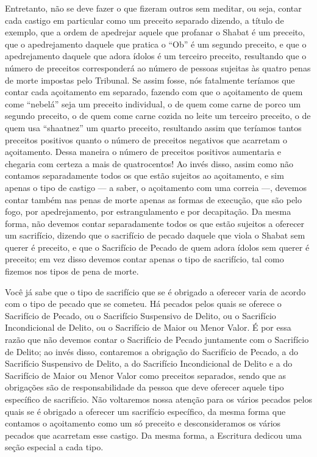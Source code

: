 Entretanto, não se deve fazer o que fizeram outros sem meditar, ou seja,
contar cada castigo em particular como um preceito separado dizendo, a
título de exemplo, que a ordem de apedrejar aquele que profanar o Shabat
é um preceito, que o apedrejamento daquele que pratica o ``Ob'' é um
segundo preceito, e que o apedrejamento daquele que adora ídolos é um
terceiro preceito, resultando que o número de preceitos corresponderá ao
número de pessoas sujeitas às quatro penas de morte impostas pelo
Tribunal. Se assim fosse, nós fatalmente teríamos que contar cada
açoitamento em separado, fazendo com que o açoitamento de quem come
``nebelá'' seja um preceito individual, o de quem come carne de porco um
segundo preceito, o de quem come carne cozida no leite um terceiro
preceito, o de quem usa ``shaatnez'' um quarto preceito, resultando
assim que teríamos tantos preceitos positivos quanto o número de
preceitos negativos que acarretam o açoitamento. Dessa maneira o número
de preceitos positivos aumentaria e chegaria com certeza a mais de
quatrocentos! Ao invés disso, assim como não contamos separadamente
todos os que estão sujeitos ao açoitamento, e sim apenas o tipo de
castigo --- a saber, o açoitamento com uma correia ---, devemos contar
também nas penas de morte apenas as formas de execução, que são pelo
fogo, por apedrejamento, por estrangulamento e por decapitação. Da
mesma forma, não devemos contar separadamente todos os que estão
sujeitos a oferecer um sacrifício, dizendo que o sacrifício de pecado
daquele que viola o Shabat sem querer é preceito, e que o Sacrifício de
Pecado de quem adora ídolos sem querer é preceito; em vez disso devemos
contar apenas o tipo de sacrifício, tal como fizemos nos tipos de pena
de morte.

Você já sabe que o tipo de sacrifício que se é obrigado a oferecer varia
de acordo com o tipo de pecado que se cometeu. Há pecados pelos quais se
oferece o Sacrifício de Pecado, ou o Sacrifício Suspensivo de Delito, ou
o Sacrifício Incondicional de Delito, ou o Sacrifício de Maior ou Menor
Valor.
É por essa razão que não devemos contar o Sacrifício de Pecado
juntamente com o Sacrifício de Delito; ao invés disso, contaremos a
obrigação do Sacrifício de Pecado, a do Sacrifício Suspensivo de
Delito, a do Sacrifício Incondicional de Delito e a do Sacrifício de
Maior ou Menor Valor como preceitos separados, sendo que as obrigações
são de responsabilidade da pessoa que deve oferecer aquele tipo
específico de sacrifício. Não voltaremos nossa atenção para os vários
pecados pelos quais se é obrigado a oferecer um sacrifício específico,
da mesma forma que contamos o açoitamento como um só preceito e
desconsideramos os vários pecados que acarretam esse castigo. Da mesma
forma, a Escritura dedicou uma seção especial a cada tipo.

